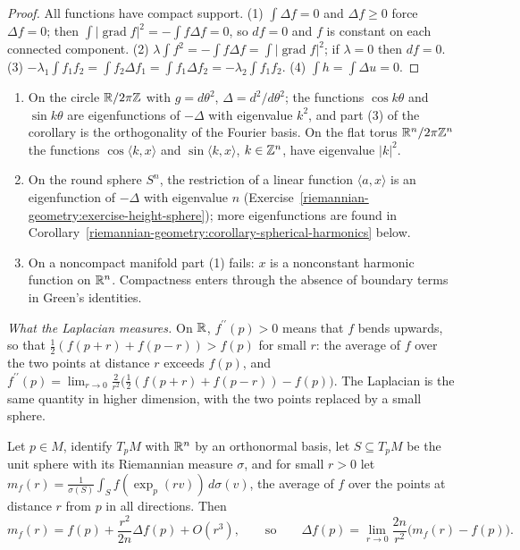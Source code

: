 \begin{proof}
All functions have compact support. (1) $\int\Delta f = 0$ and $\Delta f \geq 0$ force $\Delta f = 0$; then $\int|\operatorname{grad}f|^2 = -\int f\Delta f = 0$, so $df = 0$ and $f$ is constant
on each connected component. (2) $\lambda\int f^2 = -\int f\Delta f = \int|\operatorname{grad}f|^2$; if $\lambda = 0$ then $df = 0$. (3) $-\lambda_1\int f_1f_2 = \int f_2\Delta f_1 =
\int f_1\Delta f_2 = -\lambda_2\int f_1f_2$. (4) $\int h = \int\Delta u = 0$.
\end{proof}

\begin{example}\label{riemannian-geometry:example-laplacian-eigen}
\begin{enumerate}
\item On the circle $\mathbb{R}/2\pi\mathbb{Z}$ with $g = d\theta^2$, $\Delta = d^2/d\theta^2$; the functions $\cos k\theta$ and $\sin k\theta$ are eigenfunctions of $-\Delta$ with eigenvalue $k^2$, and part (3)
of the corollary is the orthogonality of the Fourier basis. On the flat torus $\mathbb{R}^n/2\pi\mathbb{Z}^n$ the functions $\cos\langle k, x\rangle$ and $\sin\langle k, x\rangle$, $k \in \mathbb{Z}^n$, have eigenvalue $|k|^2$.
\item On the round sphere $S^n$, the restriction of a linear function $\langle a, x\rangle$ is an eigenfunction of $-\Delta$ with eigenvalue $n$
(Exercise~\ref{riemannian-geometry:exercise-height-sphere}); more eigenfunctions are found in Corollary~\ref{riemannian-geometry:corollary-spherical-harmonics} below.
\item On a noncompact manifold part (1) fails: $x$ is a nonconstant harmonic function on $\mathbb{R}^n$. Compactness enters through the absence of boundary terms in Green's identities.
\end{enumerate}
\end{example}

\emph{What the Laplacian measures.} On $\mathbb{R}$, $f^{\prime\prime}(p) > 0$ means that $f$ bends upwards, so that $\frac12(f(p + r) + f(p - r)) > f(p)$ for small $r$: the average of $f$ over the
two points at distance $r$ exceeds $f(p)$, and $f^{\prime\prime}(p) = \lim_{r\to0}\frac{2}{r^2}\bigl(\frac12(f(p + r) + f(p - r)) - f(p)\bigr)$. The Laplacian is the same quantity in higher
dimension, with the two points replaced by a small sphere.

\begin{proposition}\label{riemannian-geometry:proposition-laplacian-mean}
Let $p \in M$, identify $T_pM$ with $\mathbb{R}^n$ by an orthonormal basis, let $S \subseteq T_pM$ be the unit sphere with its Riemannian measure $\sigma$, and for small $r > 0$ let
$m_f(r) = \frac{1}{\sigma(S)}\int_Sf(\exp_p(rv))\,d\sigma(v)$, the average of $f$ over the points at distance $r$ from $p$ in all directions. Then
\[
m_f(r) = f(p) + \frac{r^2}{2n}\Delta f(p) + O(r^3), \qquad\text{so}\qquad \Delta f(p) = \lim_{r\to0}\frac{2n}{r^2}\bigl(m_f(r) - f(p)\bigr).
\]
\end{proposition}


